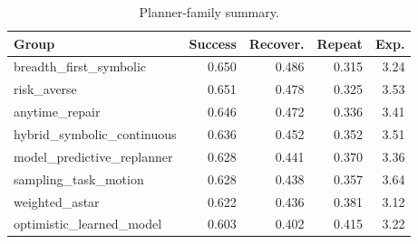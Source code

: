 \begin{table}[t]
\centering
\caption{Planner-family summary.}
\label{tab:planner-summary}
\small
\begin{tabular}{lrrrr}
\toprule
Group & Success & Recover. & Repeat & Exp. \\
\midrule
breadth\_first\_symbolic & 0.650 & 0.486 & 0.315 & 3.24 \\
risk\_averse & 0.651 & 0.478 & 0.325 & 3.53 \\
anytime\_repair & 0.646 & 0.472 & 0.336 & 3.41 \\
hybrid\_symbolic\_continuous & 0.636 & 0.452 & 0.352 & 3.51 \\
model\_predictive\_replanner & 0.628 & 0.441 & 0.370 & 3.36 \\
sampling\_task\_motion & 0.628 & 0.438 & 0.357 & 3.64 \\
weighted\_astar & 0.622 & 0.436 & 0.381 & 3.12 \\
optimistic\_learned\_model & 0.603 & 0.402 & 0.415 & 3.22 \\
\bottomrule
\end{tabular}
\end{table}
